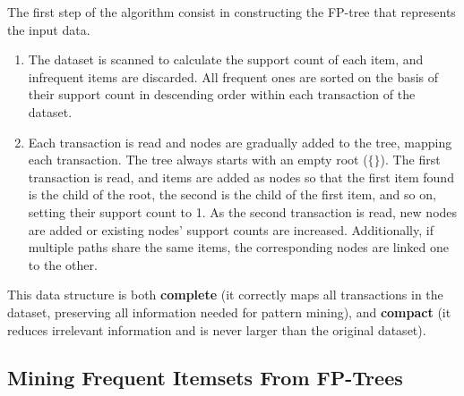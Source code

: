 The first step of the algorithm consist in constructing the FP-tree that represents the input data.
\begin{enumerate}
    \item The dataset is scanned to calculate the support count of each item, and infrequent items are discarded. All frequent ones are sorted on the basis of their support count in descending order within each transaction of the dataset.

    \item Each transaction is read and nodes are gradually added to the tree, mapping each transaction. The tree always starts with an empty root ($\{\}$). The first transaction is read, and items are added as nodes so that the first item found is the child of the root, the second is the child of the first item, and so on, setting their support count to 1. As the second transaction is read, new nodes are added or existing nodes' support counts are increased. Additionally, if multiple paths share the same items, the corresponding nodes are linked one to the other.
\end{enumerate}

This data structure is both \textbf{complete} (it correctly maps all transactions in the dataset, preserving all information needed for pattern mining), and \textbf{compact} (it reduces irrelevant information and is never larger than the original dataset).

\subsection{Mining Frequent Itemsets From FP-Trees}

